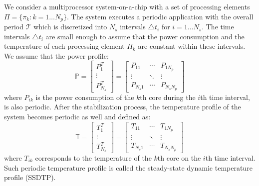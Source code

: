 We consider a multiprocessor system-on-a-chip with a set of processing elements $\Pi = \{ \pi_k: k = 1 \dots N_p \}$. The system executes a periodic application with the overall period $\mathcal{T}$ which is discretized into $N_s$ intervals $\triangle t_i$ for $i = 1 \dots N_s$. The time intervals $\triangle t_i$ are small enough to assume that the power consumption and the temperature of each processing element $\Pi_k$ are constant within these intervals. We assume that the power profile:
\begin{equation*}
  \mathbb{P} = \left[
    \begin{array}{c}
      P_1^T \\
      \vdots \\
      P_{N_s}^T
    \end{array}
  \right] = \left[
    \begin{array}{ccc}
      P_{11} & \cdots & P_{1 N_p} \\
      \vdots & \ddots & \vdots \\
      P_{N_s 1} & \cdots & P_{N_s N_p}
    \end{array}
  \right]
\end{equation*}
where $P_{ik}$ is the power consumption of the $k$th core during the $i$th time interval, is also periodic. After the stabilization process, the temperature profile of the system becomes periodic as well and defined as:
\begin{equation*}
  \mathbb{T} = \left[
    \begin{array}{c}
      T_1^T \\
      \vdots \\
      T_{N_s}^T
    \end{array}
  \right] = \left[
    \begin{array}{ccc}
      T_{11} & \cdots & T_{1 N_p} \\
      \vdots & \ddots & \vdots \\
      T_{N_s 1} & \cdots & T_{N_s N_p}
    \end{array}
  \right]
\end{equation*}
where $T_{ik}$ corresponds to the temperature of the $k$th core on the $i$th time interval. Such periodic temperature profile is called the steady-state dynamic temperature profile (SSDTP).

